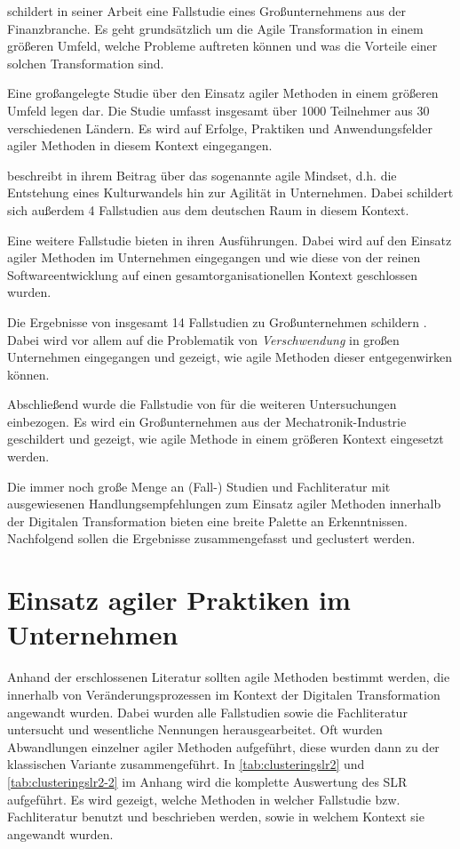  schildert in seiner Arbeit eine Fallstudie eines Großunternehmens aus der Finanzbranche. Es geht grundsätzlich um die Agile Transformation in einem größeren Umfeld, welche Probleme auftreten können und was die Vorteile einer solchen Transformation sind.

Eine großangelegte Studie über den Einsatz agiler Methoden in einem größeren Umfeld legen  dar. Die Studie umfasst insgesamt über 1000 Teilnehmer aus 30 verschiedenen Ländern. Es wird auf Erfolge, Praktiken und Anwendungsfelder agiler Methoden in diesem Kontext eingegangen.

 beschreibt in ihrem Beitrag über das sogenannte agile Mindset, d.h. die Entstehung eines Kulturwandels hin zur Agilität in Unternehmen. Dabei schildert sich außerdem 4 Fallstudien aus dem deutschen Raum in diesem Kontext. 

Eine weitere Fallstudie bieten  in ihren Ausführungen. Dabei wird auf den Einsatz agiler Methoden im Unternehmen eingegangen und wie diese von der reinen Softwareentwicklung auf einen gesamtorganisationellen Kontext geschlossen wurden.

Die Ergebnisse von insgesamt 14 Fallstudien zu Großunternehmen schildern . Dabei wird vor allem auf die Problematik von \textit{Verschwendung} in großen Unternehmen eingegangen und gezeigt, wie agile Methoden dieser entgegenwirken können.

Abschließend wurde die Fallstudie von  für die weiteren Untersuchungen einbezogen. Es wird ein Großunternehmen aus der Mechatronik-Industrie geschildert und gezeigt, wie agile Methode in einem größeren Kontext eingesetzt werden. 

Die immer noch große Menge an (Fall-) Studien und Fachliteratur mit ausgewiesenen Handlungsempfehlungen zum Einsatz agiler Methoden innerhalb der Digitalen Transformation bieten eine breite Palette an Erkenntnissen. Nachfolgend sollen die Ergebnisse zusammengefasst und geclustert werden.

\section{Einsatz agiler Praktiken im Unternehmen}


Anhand der erschlossenen Literatur sollten agile Methoden bestimmt werden, die innerhalb von Veränderungsprozessen im Kontext der Digitalen Transformation angewandt wurden. Dabei wurden alle Fallstudien sowie die Fachliteratur untersucht und wesentliche Nennungen herausgearbeitet. Oft wurden Abwandlungen einzelner agiler Methoden aufgeführt, diese wurden dann zu der klassischen Variante zusammengeführt. In  \ref{tab:clusteringslr2} und \ref{tab:clusteringslr2-2} im Anhang wird die komplette Auswertung des SLR aufgeführt. Es wird gezeigt, welche Methoden in welcher Fallstudie bzw. Fachliteratur benutzt und beschrieben werden, sowie in welchem Kontext sie angewandt wurden. 

